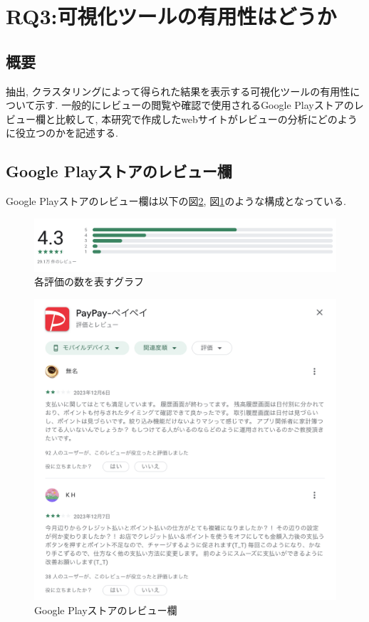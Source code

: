 
\section{RQ3:可視化ツールの有用性はどうか}
\subsection{概要}
抽出, クラスタリングによって得られた結果を表示する可視化ツールの有用性について示す. 一般的にレビューの閲覧や確認で使用されるGoogle Playストアのレビュー欄と比較して, 本研究で作成したwebサイトがレビューの分析にどのように役立つのかを記述する. 

\subsection{Google Playストアのレビュー欄}
Google Playストアのレビュー欄は以下の図\ref{fig:google_play}, 図\ref{fig:google_play_graph}のような構成となっている. 

\begin{figure}[H]
  \centering
  \includegraphics[scale=0.4]
    {contents/images/google_play_graph.png}
  \caption{各評価の数を表すグラフ\label{fig:google_play_graph}}
\end{figure}

\begin{figure}[H]
  \centering
  \includegraphics[scale=0.4]
    {contents/images/google_play.png}
  \caption{Google Playストアのレビュー欄\label{fig:google_play}}
\end{figure}

